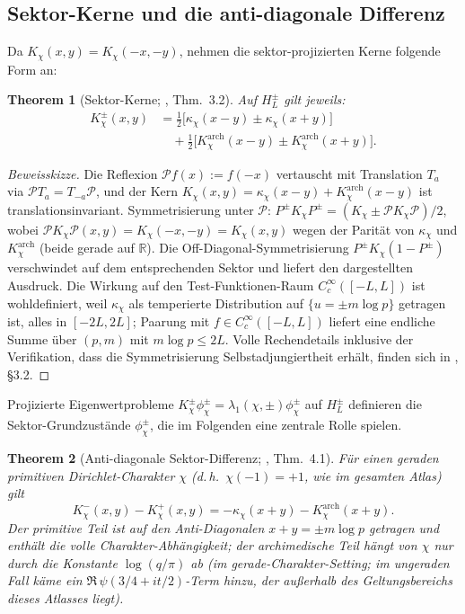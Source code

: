 \documentclass[10pt,twocolumn]{article}
\newtheorem{theorem}{Theorem}[section]
\theoremstyle{definition}
\theoremstyle{remark}
\newcommand{\chifn}{\chi}
\begin{document}
\subsection{Sektor-Kerne und die anti-diagonale Differenz}

Da $K_{\chifn}(x,y)=K_{\chifn}(-x,-y)$, nehmen die sektor-projizierten
Kerne folgende Form an:
\begin{theorem}[Sektor-Kerne; {\cite{AnalyticKernel}, Thm.~3.2}]
\label{thm:kernel}
Auf $H_L^\pm$ gilt jeweils:
\[
\begin{aligned}
  K_{\chifn}^{\pm}(x,y)
    &=\tfrac{1}{2}\bigl[\kappa_{\chifn}(x-y)
       \pm\kappa_{\chifn}(x+y)\bigr]\\
    &\quad+\tfrac{1}{2}\bigl[K^{\mathrm{arch}}_{\chifn}(x-y)
       \pm K^{\mathrm{arch}}_{\chifn}(x+y)\bigr].
\end{aligned}
\]
\end{theorem}

\begin{proof}[Beweisskizze]
Die Reflexion $\mathcal{P}f(x):=f(-x)$ vertauscht mit Translation
$T_a$ via $\mathcal{P}T_a=T_{-a}\mathcal{P}$, und der Kern
$K_\chi(x,y)=\kappa_\chi(x-y)+K^{\mathrm{arch}}_\chi(x-y)$ ist
translationsinvariant. Symmetrisierung unter $\mathcal{P}$:
$P^\pm K_\chi P^\pm = (K_\chi \pm \mathcal{P}K_\chi\mathcal{P})/2$,
wobei $\mathcal{P}K_\chi\mathcal{P}(x,y)=K_\chi(-x,-y)=K_\chi(x,y)$
wegen der Parität von $\kappa_\chi$ und $K^{\mathrm{arch}}_\chi$
(beide gerade auf $\mathbb{R}$). Die Off-Diagonal-Symmetrisierung
$P^\pm K_\chi (1-P^\pm)$ verschwindet auf dem entsprechenden Sektor
und liefert den dargestellten Ausdruck. Die Wirkung auf den
Test-Funktionen-Raum $C_c^\infty([-L,L])$ ist wohldefiniert, weil
$\kappa_\chi$ als temperierte Distribution auf $\{u=\pm m\log p\}$
getragen ist, alles in $[-2L,2L]$; Paarung mit $f\in C_c^\infty([-L,L])$
liefert eine endliche Summe über $(p,m)$ mit $m\log p\leq 2L$. Volle
Rechendetails inklusive der Verifikation, dass die Symmetrisierung
Selbstadjungiertheit erhält, finden sich in \cite{AnalyticKernel},
\S3.2.
\end{proof}

Projizierte Eigenwertprobleme
$K_{\chifn}^{\pm}\phi_{\chifn}^{\pm}=\lambda_1(\chifn,\pm)\phi_{\chifn}^{\pm}$
auf $H_L^\pm$ definieren die Sektor-Grundzustände $\phi_{\chifn}^\pm$,
die im Folgenden eine zentrale Rolle spielen.

\begin{theorem}[Anti-diagonale Sektor-Differenz; {\cite{AnalyticKernel}, Thm.~4.1}]
\label{thm:sector-diff}
Für einen geraden primitiven Dirichlet-Charakter $\chifn$ (d.\,h.\
$\chifn(-1)=+1$, wie im gesamten Atlas) gilt
\[
  K_{\chifn}^-(x,y)-K_{\chifn}^+(x,y)
    =-\kappa_{\chifn}(x+y)-K^{\mathrm{arch}}_{\chifn}(x+y).
\]
Der primitive Teil ist auf den Anti-Diagonalen $x+y=\pm m\log p$ getragen
und enthält die volle Charakter-Abhängigkeit; der archimedische Teil
hängt von $\chifn$ nur durch die Konstante $\log(q/\pi)$ ab (im
gerade-Charakter-Setting; im ungeraden Fall käme ein
$\Re\,\psi(3/4+it/2)$-Term hinzu, der außerhalb des Geltungsbereichs
dieses Atlasses liegt).
\end{theorem}
\end{document}
